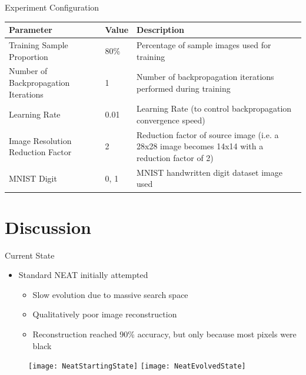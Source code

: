 \documentclass[xcolor=dvipsnames]{beamer}
\begin{document}
	\begin{frame}{Experiment Configuration}
		\begin{table}[b]
			\small
			\centering
			\begin{tabular}{|p{4cm}|p{0.8cm}|p{5cm}|}
				\hline\hline
				\textbf{Parameter} & \textbf{Value} & \textbf{Description} \\
		
				\hline
		
				Training Sample Proportion & 80\% & Percentage of sample images used for training \\
				\hline
				Number of Backpropagation Iterations & 1 & Number of backpropagation iterations performed during training \\
				\hline
				Learning Rate & 0.01 & Learning Rate (to control backpropagation convergence speed) \\
				\hline
				Image Resolution Reduction Factor & 2 & Reduction factor of source image (i.e. a 28x28 image becomes 14x14 with a reduction factor of 2) \\
				\hline
				MNIST Digit & 0, 1 & MNIST handwritten digit dataset image used \\
		
				\hline
			\end{tabular}
		\end{table}
	\end{frame}
	
	\section{Discussion}
	\begin{frame}{Current State}
		\begin{itemize}
			\item Standard NEAT initially attempted
			\begin{itemize}
				\item Slow evolution due to massive search space
				\item Qualitatively poor image reconstruction
				\item Reconstruction reached 90\% accuracy, but only because most pixels were black
			\end{itemize}			
		\end{itemize}
		\begin{figure}[h]
			\centering
			\texttt{[image: NeatStartingState]}
			\hfill
			\texttt{[image: NeatEvolvedState]}
		\end{figure}
	\end{frame}
	
\end{document}
